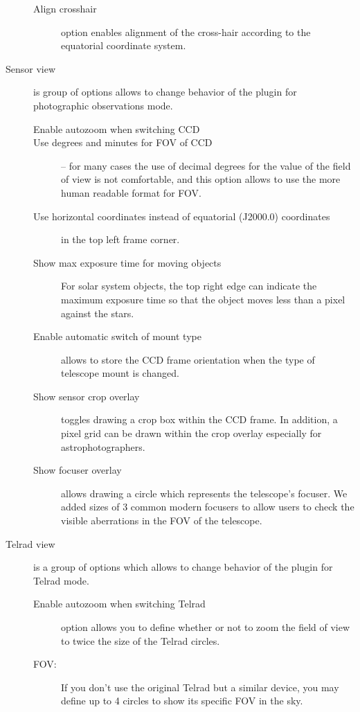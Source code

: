 \begin{description}
\begin{description}
   \item[Align crosshair] option enables alignment of the cross-hair according to the equatorial coordinate system.
 \end{description}
\item[Sensor view] is group of options allows to change behavior of the plugin for photographic observations mode.
  \begin{description}
  \item[Enable autozoom when switching CCD]  
  \item[Use degrees and minutes for FOV of CCD] -- for many cases the use of decimal degrees for the value of the field of view is not comfortable, and this option allows to use the more human readable format for FOV.
  \item[Use horizontal coordinates instead of equatorial (J2000.0) coordinates] in the top left frame corner.
  \item[Show max exposure time for moving objects] For solar system objects, the top right edge can indicate the maximum exposure time so 
         that the object moves less than a pixel against the stars.  
  \item[Enable automatic switch of mount type] allows to store the CCD frame orientation when the type of telescope mount is changed.
  \item[Show sensor crop overlay] toggles drawing a crop box within the CCD frame.
    In addition, a pixel grid can be drawn within the crop overlay especially for astrophotographers.
  \item[Show focuser overlay] allows drawing a circle which represents the telescope's focuser.
    We added sizes of 3 common modern focusers to allow users to check the visible aberrations in the FOV of the telescope.
 \end{description}
\item[Telrad view] is a group of options which allows to change behavior of the plugin for Telrad mode.
 \begin{description}
 \item[Enable autozoom when switching Telrad] option allows you to define whether or not to zoom the field of view to twice the size of the Telrad circles.
 \item[FOV:] If you don't use the original Telrad but a similar device, you may define up to 4 circles to show its specific FOV in the sky. 
 \end{description}
\end{description}

